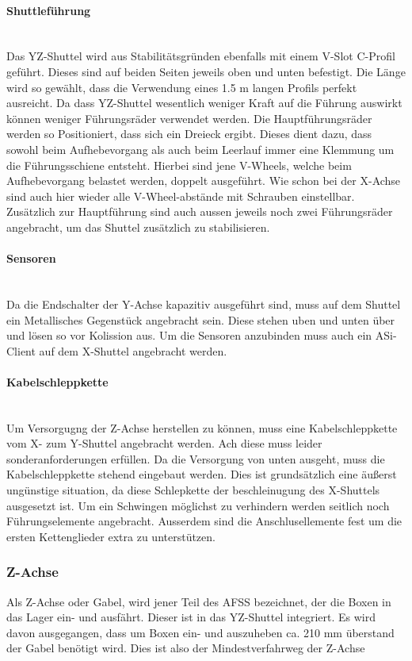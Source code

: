 \paragraph{Shuttleführung}\mbox{}\\
Das YZ-Shuttel wird aus Stabilitätsgründen ebenfalls mit einem V-Slot C-Profil geführt. Dieses sind auf beiden Seiten jeweils oben und unten befestigt. Die Länge wird so gewählt, dass die Verwendung eines 1.5 m langen Profils perfekt ausreicht. Da dass YZ-Shuttel wesentlich weniger Kraft auf die Führung auswirkt können weniger Führungsräder verwendet werden. Die Hauptführungsräder werden so Positioniert,  dass sich ein Dreieck ergibt. Dieses dient dazu, dass sowohl beim Aufhebevorgang als auch beim Leerlauf immer eine Klemmung um die Führungsschiene entsteht. Hierbei sind jene V-Wheels, welche beim Aufhebevorgang belastet werden, doppelt ausgeführt. Wie schon bei der X-Achse sind auch hier wieder alle V-Wheel-abstände mit Schrauben einstellbar. Zusätzlich zur Hauptführung sind auch aussen jeweils noch zwei Führungsräder angebracht, um das Shuttel zusätzlich zu stabilisieren.

\paragraph{Sensoren}\mbox{}\\
Da die Endschalter der Y-Achse kapazitiv ausgeführt sind, muss auf dem Shuttel ein Metallisches Gegenstück angebracht sein. Diese stehen uben und unten über und lösen so vor Kolission aus. Um die Sensoren anzubinden muss auch ein ASi-Client auf dem X-Shuttel angebracht werden.

\paragraph{Kabelschleppkette}\mbox{}\\
Um Versorgugng der Z-Achse herstellen zu können, muss eine Kabelschleppkette vom X- zum Y-Shuttel angebracht werden. Ach diese muss leider sonderanforderungen erfüllen. Da die Versorgung von unten ausgeht, muss die Kabelschleppkette stehend eingebaut werden. Dies ist grundsätzlich eine äußerst ungünstige situation, da diese Schlepkette der beschleinugung des X-Shuttels ausgesetzt ist. Um ein Schwingen möglichst zu verhindern werden seitlich noch Führungselemente angebracht. Ausserdem sind die Anschlusellemente fest um die ersten Kettenglieder extra zu unterstützen. \cite{igus_vertikal}

\subsubsection{Z-Achse}
Als Z-Achse oder Gabel, wird jener Teil des AFSS bezeichnet, der die Boxen in das Lager ein- und ausfährt. Dieser ist in das YZ-Shuttel integriert. Es wird davon ausgegangen, dass um Boxen ein- und auszuheben ca. 210 mm überstand der Gabel benötigt wird. Dies ist also der Mindestverfahrweg der Z-Achse

